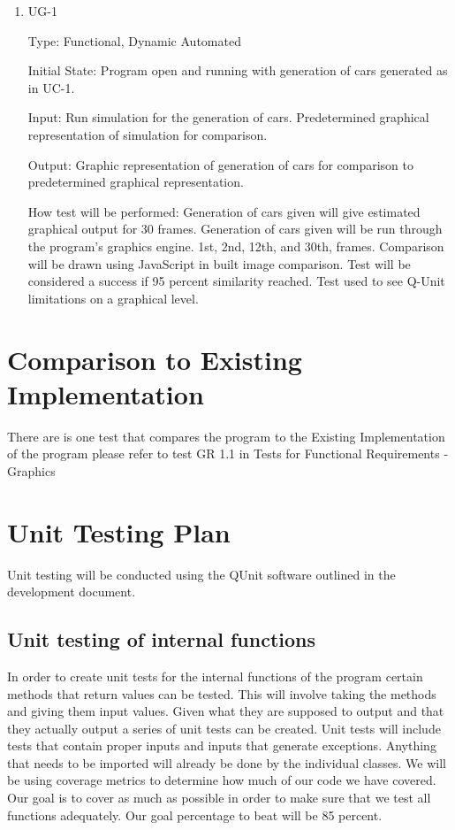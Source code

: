 \documentclass[12pt, titlepage]{article}
\begin{document}
\begin{enumerate}

\item{UG-1\\}

Type: Functional, Dynamic Automated
					
Initial State: Program open and running with generation of cars generated as in UC-1.
					
Input: Run simulation for the generation of cars. Predetermined graphical representation of simulation for comparison.
					
Output: Graphic representation of generation of cars for comparison to predetermined graphical representation.
					
How test will be performed: Generation of cars given will give estimated graphical output for 30 frames. Generation of cars given will be run through the program's graphics engine. 1st, 2nd, 12th, and 30th, frames. Comparison will be drawn using JavaScript in built image comparison. Test will be considered a success if 95 percent similarity reached. Test used to see Q-Unit limitations on a graphical level.

\end{enumerate}
	
\section{Comparison to Existing Implementation}	

There are is one test that compares the program to the Existing Implementation of the program please refer to test GR 1.1 in Tests for Functional Requirements - Graphics
				
\section{Unit Testing Plan}

Unit testing will be conducted using the QUnit software outlined in the development document.
		
\subsection{Unit testing of internal functions}

In order to create unit tests for the internal functions of the program certain methods that return values
can be tested. This will involve taking the methods and giving them input values. Given what they are
supposed to output and that they actually output a series of unit tests can be created. Unit tests will include
tests that contain proper inputs and inputs that generate exceptions.  Anything that needs to be imported will already be done
by the individual classes. We will be using coverage metrics to determine how much of our code we have
covered. Our goal is to cover as much as possible in order to make sure that we test all functions adequately.
Our goal percentage to beat will be 85 percent.
		
\end{document}
